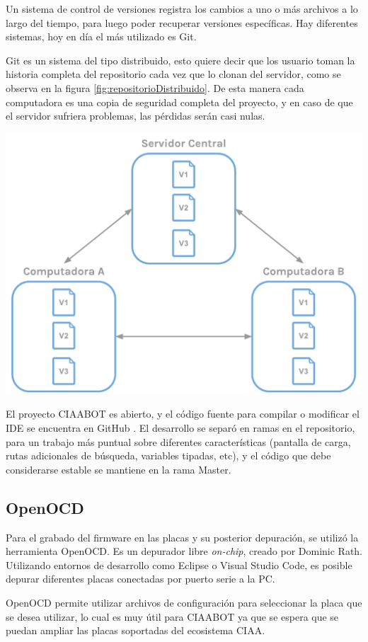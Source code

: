 Un sistema de control de versiones registra los cambios a uno o más archivos a lo largo del tiempo, para luego poder recuperar versiones específicas. Hay diferentes sistemas, hoy en día el más utilizado es Git.

Git es un sistema del tipo distribuido, esto quiere decir que los usuario toman la historia completa del repositorio cada vez que lo clonan del servidor, como se observa en la figura \ref{fig:repositorioDistribuido}. De esta manera cada computadora es una copia de seguridad completa del proyecto, y en caso de que el servidor sufriera problemas, las pérdidas serán casi nulas.

\begin{center}
    \includegraphics[scale=.6]{./Figures/repositorio-distribuido.pdf}
    \label{fig:repositorioDistribuido}
\end{center}

El proyecto CIAABOT es abierto, y el código fuente para compilar o modificar el IDE se encuentra en GitHub \citep{CIAABOT:repositorio}. El desarrollo se separó en ramas en el repositorio, para un trabajo más puntual sobre diferentes características (pantalla de carga, rutas adicionales de búsqueda, variables tipadas, etc), y el código que debe considerarse estable se mantiene en la rama Master.

\subsection{OpenOCD}
Para el grabado del firmware en las placas y su posterior depuración, se utilizó la herramienta OpenOCD. Es un depurador libre \emph{on-chip}, creado por Dominic Rath. Utilizando entornos de desarrollo como Eclipse o Visual Studio Code, es posible depurar diferentes placas conectadas por puerto serie a la PC.

OpenOCD permite utilizar archivos de configuración para seleccionar la placa que se desea utilizar, lo cual es muy útil para CIAABOT ya que se espera que se puedan ampliar las placas soportadas del ecosistema CIAA.